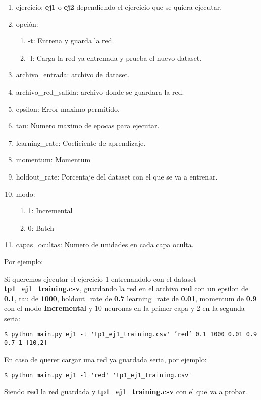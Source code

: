 \begin{enumerate}
\item ejercicio: \textbf{ej1} o \textbf{ej2} dependiendo el ejercicio que se quiera ejecutar.
\item opción: 
\begin{enumerate}
\item -t: Entrena y guarda la red.
\item -l: Carga la red ya entrenada y prueba el nuevo dataset.
\end{enumerate}
\item archivo\_entrada: archivo de dataset.
\item archivo\_red\_salida: archivo donde se guardara la red.
\item epsilon: Error maximo permitido.
\item tau: Numero maximo de epocas para ejecutar.
\item learning\_rate: Coeficiente de aprendizaje.
\item momentum: Momentum
\item holdout\_rate: Porcentaje del dataset con el que se va a entrenar.
\item modo: 
\begin{enumerate}
\item 1: Incremental
\item 0: Batch
\end{enumerate}
\item capas\_ocultas: Numero de unidades en cada capa oculta.
\end{enumerate}

Por ejemplo: 

Si queremos ejecutar el ejercicio 1 entrenandolo con el dataset \textbf{tp1\_ej1\_training.csv}, guardando la red en el archivo 
\textbf{red} con un epsilon de \textbf{0.1}, tau de \textbf{1000}, holdout\_rate de \textbf{0.7} learning\_rate de \textbf{0.01}, momentum de \textbf{0.9} con el modo \textbf{Incremental} y 10 neuronas en la primer capa y 2 en la segunda seria:

\begin{verbatim}
$ python main.py ej1 -t 'tp1_ej1_training.csv' ’red’ 0.1 1000 0.01 0.9 0.7 1 [10,2]
\end{verbatim}


En caso de querer cargar una red ya guardada seria, por ejemplo:

\begin{verbatim}
$ python main.py ej1 -l 'red' 'tp1_ej1_training.csv'
\end{verbatim}

Siendo \textbf{red} la red guardada y \textbf{tp1\_ej1\_training.csv} con el que va a probar.